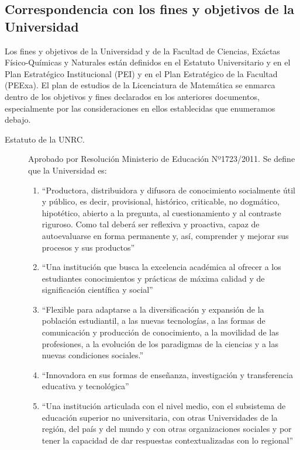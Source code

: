 \documentclass[a4paper, 12pt]{article}
\begin{document}
\subsection{Correspondencia con los fines y objetivos de la Universidad}

Los fines y objetivos de la Universidad y de la Facultad de Ciencias, Exáctas Físico-Químicas y Naturales están definidos en el Estatuto Universitario y en el Plan Estratégico Institucional (PEI) y en el Plan Estratégico  de la Facultad (PEExa). El plan de estudios de la Licenciatura de Matemática se enmarca dentro de los objetivos y fines declarados en los anteriores documentos, especialmente por las consideraciones en ellos establecidas  que enumeramos debajo. 


\begin{description}
 \item[Estatuto de la UNRC.]   Aprobado por Resolución Ministerio de Educación Nº1723/2011.  Se define que la Universidad es:
\begin{enumerate}

\item ``Productora, distribuidora y difusora de conocimiento socialmente útil y público, es
decir, provisional, histórico, criticable, no dogmático, hipotético, abierto a la
pregunta, al cuestionamiento y al contraste riguroso. Como tal deberá ser reflexiva
y proactiva, capaz de autoevaluarse en forma permanente y, así, comprender y
mejorar sus procesos y sus productos''


\item ``Una institución que busca la excelencia académica al ofrecer a los estudiantes
conocimientos y prácticas de máxima calidad y de significación científica y social''

\item ``Flexible para adaptarse a la diversificación y expansión de la población estudiantil, 
a las nuevas tecnologías, a las formas de comunicación y producción de
conocimiento, a la movilidad de las profesiones, a la evolución de los paradigmas
de la ciencias y a las nuevas condiciones sociales.''

\item ``Innovadora en sus formas de enseñanza, investigación y transferencia educativa y
tecnológica''

\item ``Una institución articulada con el nivel medio, con el subsistema de educación
superior no universitaria, con otras Universidades de la región, del país y del
mundo y con otras organizaciones sociales y por tener la capacidad de dar
respuestas contextualizadas con lo regional''


\end{enumerate}
\end{description}
\end{document}
